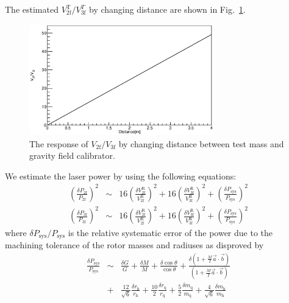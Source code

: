 \documentclass[%
 reprint,
superscriptaddress,
 amsmath,amssymb,
 aps,
]{revtex4-1}
\begin{document}
\normalsize
The estimated $V^{\mathrm{T}}_{\mathrm{2f}}/V^{T}_{\mathrm{3f}}$ by changing distance are shown in Fig.~\ref{fig:dvsVV}.
\begin{figure}
\begin{center}
\includegraphics[width=8cm]{dvsVV.eps}
\caption{The response of $V_{\mathrm{2f}}/V_{\mathrm{3f}}$ by changing distance between test mass and gravity field calibrator.}
\label{fig:dvsVV}
\end{center}
\end{figure}
We  estimate the laser power by using the following equations:
\footnotesize
\begin{eqnarray}
\left( \frac{\delta P_{\mathrm{2f}}}{P_{\mathrm{2f}}} \right)^2 &\sim&  \!16 \! \left( \frac{\delta V^{\mathrm{R}}_{{\mathrm{2f}}}}{V^{\mathrm{R}}_{{\mathrm{2f}}}} \!\right)^2+16\left( \frac{\delta V^{\mathrm{R}}_{{\mathrm{3f}}}}{V^{\mathrm{R}}_{{\mathrm{3f}}}} \right)^2 +\left( \frac{\delta P_{\mathrm{sys}}}{P_{\mathrm{sys}}} \right)^2 \label{dP2f} \\ 
\left( \frac{\delta P_{\mathrm{3f}}}{P_{\mathrm{3f}}} \right)^2 &\sim&  \!16 \! \left( \frac{\delta V^{\mathrm{R}}_{{\mathrm{2f}}}}{V^{\mathrm{R}}_{{\mathrm{2f}}}} \right)^2+16\left( \frac{\delta V^{\mathrm{R}}_{{\mathrm{3f}}}}{V^{\mathrm{R}}_{{\mathrm{3f}}}} \right)^2+\left( \frac{\delta P_{\mathrm{sys}}}{P_{\mathrm{sys}}} \right)^2  \label{dP3f}
\end{eqnarray}
\normalsize
where $\delta P_{\mathrm{sys}}/P_{\mathrm{sys}}$ is the relative systematic error  of the power due to the machining tolerance of the rotor masses and radiuses as disproved by
\begin{eqnarray}
\frac{\delta P_{\mathrm{sys}}}{P_{\mathrm{sys}}}&\sim& \frac{\delta G}{G} + \frac{\delta M}{M} +\frac{\delta \cos{\theta}}{\cos{\theta}}+ \frac{\delta\left( 1+\frac{M}{I}\vec{a}\cdot \vec{b} \right)}{\! \left( \! 1+\frac{M}{I}\vec{a}\cdot \vec{b} \! \right)}  \nonumber \\
&+&\frac{12}{\sqrt{6}} \frac{\delta r_{\mathrm{h}}}{r_{\mathrm{h}}} +\frac{10}{2} \frac{\delta r_{\mathrm{q}}}{r_{\mathrm{q}}}  +\frac{5}{2} \frac{\delta m_{\mathrm{q}}}{m_{\mathrm{q}}} +\!\frac{4}{\sqrt{6}}  \! \frac{\delta m_{\mathrm{h}}}{m_{\mathrm{h}}} 
\end{eqnarray}
\end{document}

